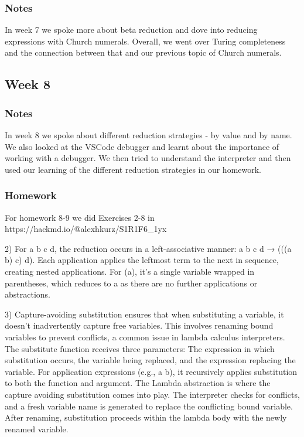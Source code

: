\documentclass{article}
\theoremstyle{theorem}
\theoremstyle{definition}
\theoremstyle{remark}
\begin{document}
\subsubsection*{Notes}
In week 7 we spoke more about beta reduction and dove into reducing expressions with Church numerals. Overall, we went over Turing completeness and the connection between that and our previous topic of Church numerals.


\subsection{Week 8}
\subsubsection*{Notes}
In week 8 we spoke about different reduction strategies - by value and by name. We also looked at the VSCode debugger and learnt about the importance of working with a debugger. We then tried to understand the interpreter and then used our learning of the different reduction strategies in our homework.

\subsubsection*{Homework}
For homework 8-9 we did Exercises 2-8 in https://hackmd.io/@alexhkurz/S1R1F6_1yx

2) For a b c d, the reduction occurs in a left-associative manner: a b c d → (((a b) c) d). Each application applies the leftmost term to the next in sequence, creating nested applications.
   For (a), it's a single variable wrapped in parentheses, which reduces to a as there are no further applications or abstractions.

3) Capture-avoiding substitution ensures that when substituting a variable, it doesn't inadvertently capture free variables.
   This involves renaming bound variables to prevent conflicts, a common issue in lambda calculus interpreters.
   The substitute function receives three parameters: The expression in which substitution occurs, the variable being replaced, and the expression replacing the variable.
   For application expressions (e.g., a b), it recursively applies substitution to both the function and argument. The Lambda abstraction is where the capture avoiding substitution comes into play.
   The interpreter checks for conflicts, and a fresh variable name is generated to replace the conflicting bound variable. After renaming, substitution proceeds within the lambda body with the newly renamed variable.
\end{document}
